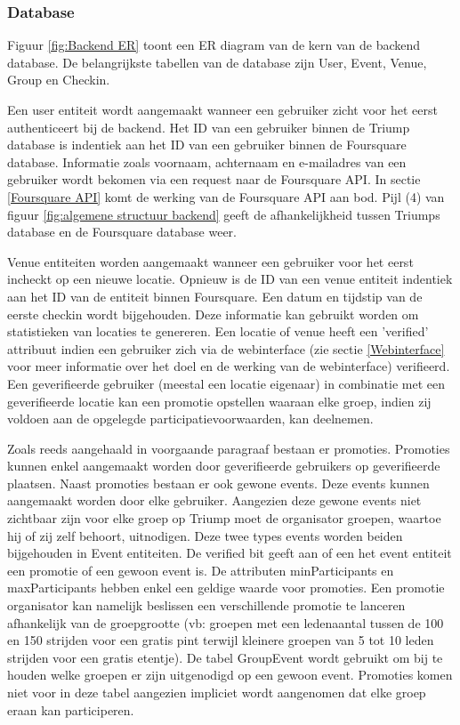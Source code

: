 \subsubsection{Database}

Figuur \ref{fig:Backend ER} toont een ER diagram van de kern van de backend database. De belangrijkste tabellen van de database zijn User, Event, Venue, Group en Checkin. 

Een user entiteit wordt aangemaakt wanneer een gebruiker zicht voor het eerst authenticeert bij de backend. Het ID van een gebruiker binnen de Triump database is indentiek aan het ID van een gebruiker binnen de Foursquare database. Informatie zoals voornaam, achternaam en e-mailadres van een gebruiker wordt bekomen via een request naar de Foursquare API. In sectie \ref{Foursquare API} komt de werking van de Foursquare API aan bod. Pijl (4) van figuur \ref{fig:algemene structuur backend} geeft de afhankelijkheid tussen Triumps database en de Foursquare database weer.

Venue entiteiten worden aangemaakt wanneer een gebruiker voor het eerst incheckt op een nieuwe locatie. Opnieuw is de ID van een venue entiteit indentiek aan het ID van de entiteit binnen Foursquare. Een datum en tijdstip van de eerste checkin wordt bijgehouden. Deze informatie kan gebruikt worden om statistieken van locaties te genereren. Een locatie of venue heeft een 'verified' attribuut indien een gebruiker zich via de webinterface (zie sectie \ref{Webinterface} voor meer informatie over het doel en de werking van de webinterface) verifieerd. Een geverifieerde gebruiker (meestal een locatie eigenaar) in combinatie met een geverifieerde locatie kan een promotie opstellen waaraan elke groep, indien zij voldoen aan de opgelegde participatievoorwaarden, kan deelnemen.

Zoals reeds aangehaald in voorgaande paragraaf bestaan er promoties. Promoties kunnen enkel aangemaakt worden door geverifieerde gebruikers op geverifieerde plaatsen. Naast promoties bestaan er ook gewone events. Deze events kunnen aangemaakt worden door elke gebruiker. Aangezien deze gewone events niet zichtbaar zijn voor elke groep op Triump moet de organisator groepen, waartoe hij of zij zelf behoort, uitnodigen. 
Deze twee types events worden beiden bijgehouden in Event entiteiten. De verified bit geeft aan of een het event entiteit een promotie of een gewoon event is. De attributen minParticipants en maxParticipants hebben enkel een geldige waarde voor promoties. Een promotie organisator kan namelijk beslissen een verschillende promotie te lanceren afhankelijk van de groepgrootte (vb: groepen met een ledenaantal tussen de 100 en 150 strijden voor een gratis pint terwijl kleinere groepen van 5 tot 10 leden strijden voor een gratis etentje). De tabel GroupEvent wordt gebruikt om bij te houden welke groepen er zijn uitgenodigd op een gewoon event. Promoties komen niet voor in deze tabel aangezien impliciet wordt aangenomen dat elke groep eraan kan participeren.

